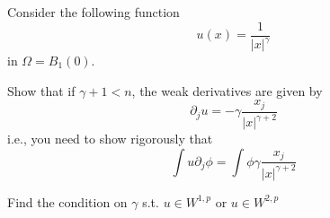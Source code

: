Consider the following function
$$
u(x) = \frac{1}{|x|^\gamma}
$$
in $\Omega = B_1(0)$.

Show that if $\gamma + 1 < n$, the weak derivatives are given by
$$
\partial_j u = -\gamma \frac{x_j}{|x|^{\gamma + 2}}
$$
i.e., you need to show rigorously that
$$
\int u \partial_j \phi = \int \phi \gamma \frac{x_j}{|x|^{\gamma + 2}}
$$

Find the condition on $\gamma$ s.t. $u \in W^{1, p}$ or $u \in W^{2, p}$
